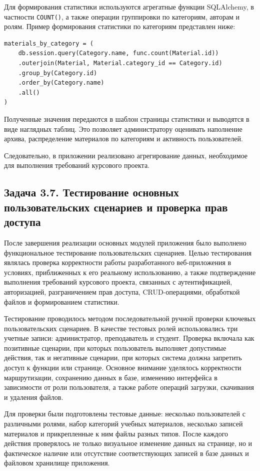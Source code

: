 \documentclass[14pt,a4paper]{extarticle}
\begin{document}
Для формирования статистики используются агрегатные функции SQLAlchemy, в частности \texttt{COUNT()}, а также операции группировки по категориям, авторам и ролям. Пример формирования статистики по категориям представлен ниже:

\begin{lstlisting}
materials_by_category = (
    db.session.query(Category.name, func.count(Material.id))
    .outerjoin(Material, Material.category_id == Category.id)
    .group_by(Category.id)
    .order_by(Category.name)
    .all()
)
\end{lstlisting}

Полученные значения передаются в шаблон страницы статистики и выводятся в виде наглядных таблиц. Это позволяет администратору оценивать наполнение архива, распределение материалов по категориям и активность пользователей.

Следовательно, в приложении реализовано агрегирование данных, необходимое для выполнения требований курсового проекта.



\subsection{Задача 3.7. Тестирование основных пользовательских сценариев и проверка прав доступа}

После завершения реализации основных модулей приложения было выполнено функциональное тестирование пользовательских сценариев. Целью тестирования являлась проверка корректности работы разработанного веб-приложения в условиях, приближенных к его реальному использованию, а также подтверждение выполнения требований курсового проекта, связанных с аутентификацией, авторизацией, разграничением прав доступа, CRUD-операциями, обработкой файлов и формированием статистики.

Тестирование проводилось методом последовательной ручной проверки ключевых пользовательских сценариев. В качестве тестовых ролей использовались три учетные записи: администратор, преподаватель и студент. Проверка включала как позитивные сценарии, при которых пользователь выполняет допустимые действия, так и негативные сценарии, при которых система должна запретить доступ к функции или странице. Основное внимание уделялось корректности маршрутизации, сохранению данных в базе, изменению интерфейса в зависимости от роли пользователя, а также работе операций загрузки, скачивания и удаления файлов.

Для проверки были подготовлены тестовые данные: несколько пользователей с различными ролями, набор категорий учебных материалов, несколько записей материалов и прикрепленные к ним файлы разных типов. После каждого действия проверялось не только визуальное изменение данных на странице, но и фактическое наличие или отсутствие соответствующих записей в базе данных и файловом хранилище приложения.
\end{document}
